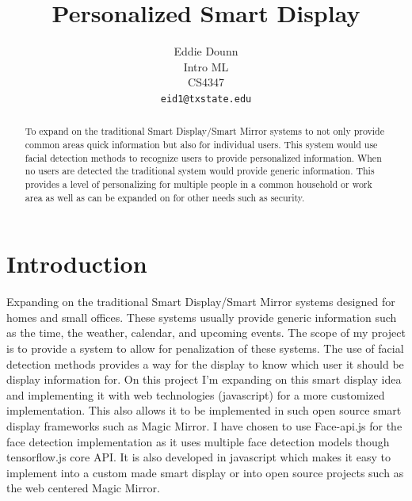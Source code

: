 \documentclass[10pt,twocolumn,letterpaper]{article}
\begin{document}
\title{Personalized Smart Display }

\author{Eddie Dounn\\
Intro ML\\
CS4347\\
{\tt\small eid1@txstate.edu}

}

\maketitle

\begin{abstract}
   To expand on the traditional Smart Display/Smart Mirror systems to not only provide common areas quick information but also for individual users.  This system would use facial detection methods to recognize users to provide personalized information.  When no users are detected the traditional system would provide generic information.  This provides a level of personalizing for multiple people in a common household or work area as well as can be expanded on for other needs such as security. 
\end{abstract}

\section{Introduction}

Expanding on the traditional Smart Display/Smart Mirror systems designed for homes and small offices.  These systems usually provide generic information such as the time, the weather, calendar, and upcoming events.  The scope of my project is to provide a system to allow for penalization of these systems.  The use of facial detection methods provides a way for the display to know which user it should be display information for.  On this project I'm expanding on this smart display idea and implementing it with web technologies (javascript) for a more customized implementation.  This also allows it to be implemented in such open source smart display frameworks such as Magic Mirror.  I have chosen to use Face-api.js for the face detection implementation as it uses multiple face detection models though tensorflow.js core API.  It is also developed in javascript which makes it easy to implement into a custom made smart display or into open source projects such as the web centered Magic Mirror. 
\end{document}
